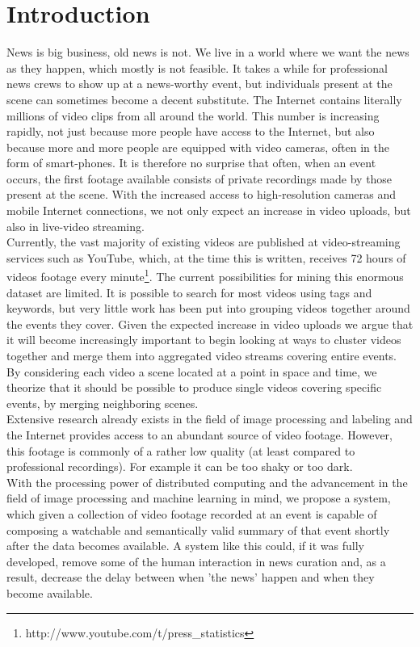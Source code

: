 %
\section{Introduction}
%
News is big business, old news is not. We live in a world where we want the news as they happen, which mostly is not feasible. It takes a while for professional news crews to show up at a news-worthy event, but individuals present at the scene can sometimes become a decent substitute. The Internet contains literally millions of video clips from all around the world. This number is increasing rapidly, not just because more people have access to the Internet, but also because more and more people are equipped with video cameras, often in the form of smart-phones. It is therefore no surprise that often, when an event occurs, the first footage available consists of private recordings made by those present at the scene. With the increased access to high-resolution cameras and mobile Internet connections, we not only expect an increase in video uploads, but also in live-video streaming.\\
Currently, the vast majority of existing videos are published at video-streaming services such as YouTube, which, at the time this is written, receives 72 hours of videos footage every minute\footnote{http://www.youtube.com/t/press\_statistics}. The current possibilities for mining this enormous dataset are limited. It is possible to search for most videos using tags and keywords, but very little work has been put into grouping videos together around the events they cover. Given the expected increase in video uploads we argue that it will become increasingly important to begin looking at ways to cluster videos together and merge them into aggregated video streams covering entire events. By considering each video a scene located at a point in space and time, we theorize that it should be possible to produce single videos covering specific events, by merging neighboring scenes.\\
Extensive research already exists in the field of image processing and labeling and the Internet provides access to an abundant source of video footage. However, this footage is commonly of a rather low quality (at least compared to professional recordings). For example it can be too shaky or too dark.\\
With the processing power of distributed computing and the advancement in the field of image processing and machine learning in mind, we propose a system, which given a collection of video footage recorded at an event is capable of composing a watchable and semantically valid summary of that event shortly after the data becomes available. A system like this could, if it was fully developed, remove some of the human interaction in news curation and, as a result, decrease the delay between when 'the news' happen and when they become available.
%
